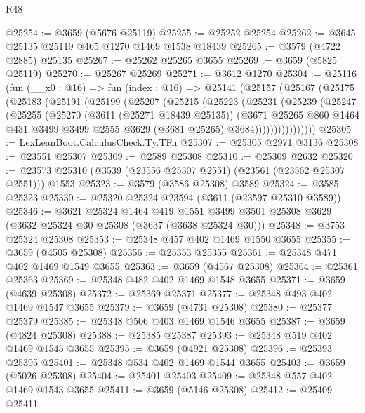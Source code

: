 \begin{lexlean}{R48}
\begin{coremodule}
@25254 := @3659 (@5676 @25119)
@25255 := @25252 @25254
@25262 := @3645 @25135 @25119 @465 @1270 @1469 @1538 @18439
@25265 := @3579 (@4722 @2885) @25135
@25267 := @25262 @25265 @3655
@25269 := @3659 (@5825 @25119)
@25270 := @25267 @25269
@25271 := @3612 @1270
@25304 := @25116
    (fun (__x0 : @16) =>
    fun (index : @16) =>
    @25141
      (@25157
        (@25167
          (@25175
            (@25183
              (@25191
                (@25199
                  (@25207
                    (@25215
                      (@25223
                        (@25231
                          (@25239
                            (@25247
                              (@25255
                                (@25270
                                  (@3611 (@25271 @18439 @25135))
                                  (@3671
                                    @25265
                                    @860
                                    @1464
                                    @431
                                    @3499
                                    @3499
                                    @2555
                                    @3629
                                    (@3681 @25265)
                                    @3684))))))))))))))))
@25305 := LexLeanBoot.CalculusCheck.Ty.TFn
@25307 := @25305 @2971 @3136
@25308 := @23551 @25307
@25309 := @2589 @25308
@25310 := @25309 @2632
@25320 := @23573 @25310 (@3539 (@23556 @25307 @2551) (@23561 (@23562 @25307 @2551))) @1553
@25323 := @3579 (@3586 @25308) @3589
@25324 := @3585 @25323
@25330 := @25320 @25324 @23594 (@3611 (@23597 @25310 @3589))
@25346 := @3621
    @25324
    @1464
    @419
    @1551
    @3499
    @3501
    @25308
    @3629
    (@3632 @25324 @30 @25308 (@3637 (@3638 @25324 @30)))
@25348 := @3753 @25324 @25308
@25353 := @25348 @457 @402 @1469 @1550 @3655
@25355 := @3659 (@4505 @25308)
@25356 := @25353 @25355
@25361 := @25348 @471 @402 @1469 @1549 @3655
@25363 := @3659 (@4567 @25308)
@25364 := @25361 @25363
@25369 := @25348 @482 @402 @1469 @1548 @3655
@25371 := @3659 (@4639 @25308)
@25372 := @25369 @25371
@25377 := @25348 @493 @402 @1469 @1547 @3655
@25379 := @3659 (@4731 @25308)
@25380 := @25377 @25379
@25385 := @25348 @506 @403 @1469 @1546 @3655
@25387 := @3659 (@4824 @25308)
@25388 := @25385 @25387
@25393 := @25348 @519 @402 @1469 @1545 @3655
@25395 := @3659 (@4921 @25308)
@25396 := @25393 @25395
@25401 := @25348 @534 @402 @1469 @1544 @3655
@25403 := @3659 (@5026 @25308)
@25404 := @25401 @25403
@25409 := @25348 @557 @402 @1469 @1543 @3655
@25411 := @3659 (@5146 @25308)
@25412 := @25409 @25411

\end{coremodule}
\end{lexlean}
